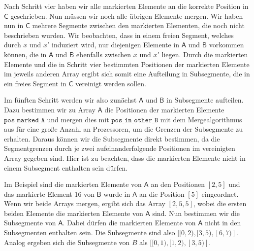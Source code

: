 Nach Schritt vier haben wir alle markierten Elemente an die korrekte Position in $\mathsf{C}$ geschrieben. Nun müssen wir noch alle übrigen Elemente mergen. Wir haben nun in $\mathsf{C}$ mehrere Segmente zwischen den markierten Elementen, die noch nicht beschrieben wurden. Wir beobachten, dass in einem freien Segment, welches durch $x$ und $x'$ induziert wird, nur diejenigen Elemente in $\mathsf{A}$ und $\mathsf{B}$ vorkommen können, die in $\mathsf{A}$ und $\mathsf{B}$ ebenfalls zwischen $x$ und $x'$ liegen. Durch die markierten Elemente und die in Schritt vier bestimmten Positionen der markierten Elemente im jeweils anderen Array ergibt sich somit eine Aufteilung in Subsegmente, die in ein freies Segment in $\mathsf{C}$ vereinigt werden sollen. \par
Im fünften Schritt werden wir also zunächst $\mathsf{A}$ und $\mathsf{B}$ in Subsegmente aufteilen. Dazu bestimmen wir zu Array $\mathsf{A}$ die Positionen der markierten Elemente $\texttt{pos\_marked\_A}$ und mergen dies mit $\texttt{pos\_in\_other\_B}$ mit dem Mergealgorithmus aus für eine große Anzahl an Prozessoren, um die Grenzen der Subsegmente zu erhalten. Daraus können wir die Subsegmente direkt bestimmen, da die Segmentgrenzen durch je zwei aufeinanderfolgende Positionen im vereinigten Array gegeben sind. Hier ist zu beachten, dass die markierten Elemente nicht in einem Subsegment enthalten sein dürfen. \par
Im Beispiel sind die markierten Elemente von $\mathsf{A}$ an den Positionen $[2,5]$ und das markierte Element $16$ von $\mathsf{B}$ wurde in $\mathsf{A}$ an die Position $[5]$ eingeordnet. Wenn wir beide Arrays mergen, ergibt sich das Array $[2,5,5]$, wobei die ersten beiden Elemente die markierten Elemente von $\mathsf{A}$ sind. Nun bestimmen wir die Subsegmente von $\mathsf{A}$. Dabei dürfen die markierten Elemente von $\mathsf{A}$ nicht in den Subsegmenten enthalten sein. Die Subsegmente sind also $[[0,2), [3,5), [6,7)]$. Analog ergeben sich die Subsegmente von $B$ als $[[0,1), [1,2), [3,5)]$.

